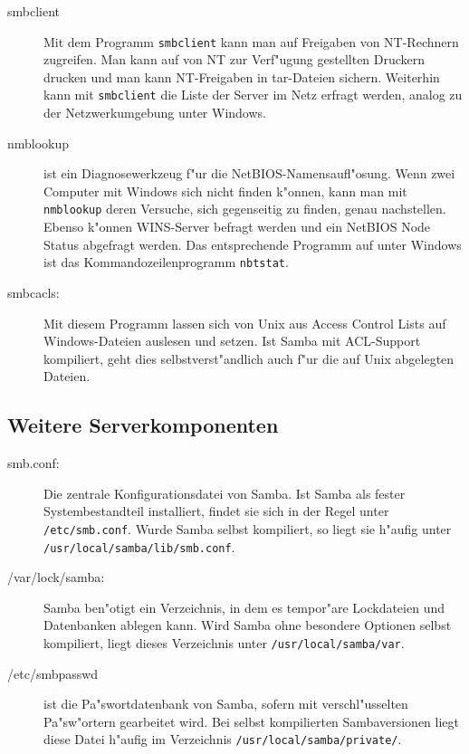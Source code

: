 \documentclass{scrartcl}\usepackage{pslatex}\typearea{12}
\newcommand{\prog}{\texttt}
\newcommand{\dateistyle}{\texttt}
\begin{document}
\begin{description}
  
\item[smbclient] Mit dem Programm \prog{smbclient} kann man auf
  Freigaben von NT-Rechnern zugreifen. Man kann auf von NT zur
  Verf"ugung gestellten Druckern drucken und man kann NT-Freigaben in
  tar-Dateien sichern. Weiterhin kann mit \prog{smbclient} die Liste
  der Server im Netz erfragt werden, analog zu der Netzwerkumgebung
  unter Windows.
  
\item[nmblookup] ist ein Diagnosewerkzeug f"ur die
  NetBIOS-Namensaufl"osung. Wenn zwei Computer mit Windows sich nicht
  finden k"onnen, kann man mit \prog{nmblookup} deren Versuche, sich
  gegenseitig zu finden, genau nachstellen. Ebenso k"onnen WINS-Server
  befragt werden und ein NetBIOS Node Status abgefragt werden. Das
  entsprechende Programm auf unter Windows ist das
  Kommandozeilenprogramm \prog{nbtstat}.
  
\item[smbcacls:] Mit diesem Programm lassen sich von Unix aus Access
  Control Lists auf Windows-Dateien auslesen und setzen. Ist Samba mit
  ACL-Support kompiliert, geht dies selbstverst"andlich auch f"ur die
  auf Unix abgelegten Dateien.

\end{description}

\subsection{Weitere Serverkomponenten}

\begin{description}
  
\item[smb.conf:] Die zentrale Konfigurationsdatei von Samba. Ist Samba
  als fester Systembestandteil installiert, findet sie sich in der
  Regel unter \dateistyle{/etc/smb.conf}. Wurde Samba selbst
  kompiliert, so liegt sie h"aufig unter
  \dateistyle{/usr/local/samba/lib/smb.conf}.
  
\item[/var/lock/samba:] Samba ben"otigt ein Verzeichnis, in dem es
  tempor"are Lockdateien und Datenbanken ablegen kann. Wird Samba ohne
  besondere Optionen selbst kompiliert, liegt dieses Verzeichnis unter
  \dateistyle{/usr/local/samba/var}.
  
\item[/etc/smbpasswd] ist die Pa"swortdatenbank von Samba, sofern mit
  verschl"usselten Pa"s\-w"ortern gearbeitet wird. Bei selbst
  kompilierten Sambaversionen liegt diese Datei h"aufig im Verzeichnis
  \dateistyle{/usr/local/samba/private/}.

\end{description}
\end{document}
